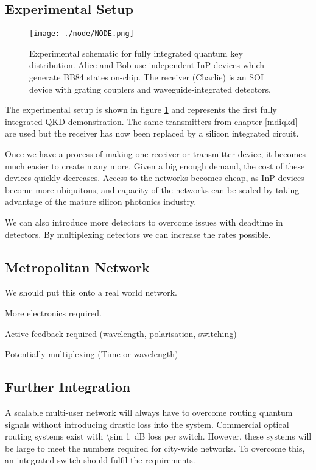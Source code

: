 \subsection{Experimental Setup}

\begin{figure}[t]
	\centering
	\texttt{[image: ./node/NODE.png]}
	\caption[Schematic of a fully optically integrated QKD system]{Experimental schematic for fully integrated quantum key distribution. Alice and Bob use independent InP devices which generate BB84 states on-chip. The receiver (Charlie) is an SOI device with grating couplers and waveguide-integrated detectors.}
	\label{fig:node}
\end{figure}

The experimental setup is shown in figure \ref{fig:node} and represents the first fully integrated \ac{QKD} demonstration. The same transmitters from chapter \ref{mdiqkd} are used but the receiver has now been replaced by a silicon integrated circuit. 

Once we have a process of making one receiver or transmitter device, it becomes much easier to create many more. Given a big enough demand, the cost of these devices quickly decreases. Access to the networks becomes cheap, as \ac{InP} devices become more ubiquitous, and capacity of the networks can be scaled by taking advantage of the mature silicon photonics industry.

We can also introduce more detectors to overcome issues with deadtime in detectors. By multiplexing detectors we can increase the rates possible.

\subsection{Metropolitan Network}

We should put this onto a real world network.

More electronics required.

Active feedback required (wavelength, polarisation, switching)

Potentially multiplexing (Time or wavelength)

\subsection{Further Integration}

A scalable multi-user network will always have to overcome routing quantum signals without introducing drastic loss into the system. Commercial optical routing systems exist with \SI{\sim 1}{dB} loss per switch. However, these systems will be large to meet the numbers required for city-wide networks. To overcome this, an integrated switch should fulfil the requirements. 

